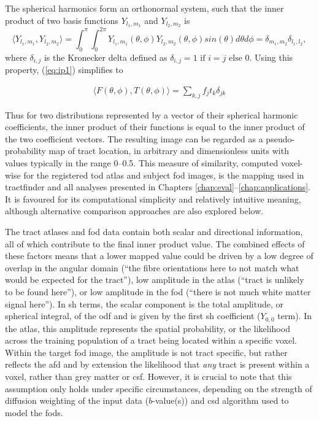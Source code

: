 The spherical harmonics form an orthonormal system, such that the inner product of two basis functions $Y_{l_1,m_1}$ and $Y_{l_2,m_2}$ is
\begin{equation}
  \langle Y_{l_1,m_1}, Y_{l_2,m_2} \rangle
    = \int_0^{\pi} \int_0^{2\pi} Y_{l_1,m_1}(\theta, \phi) Y_{l_2,m_2}(\theta, \phi) sin(\theta) d\theta d\phi
    = \delta_{m_1, m_2} \delta_{l_1, l_2},
\end{equation}
where $\delta_{i,j}$ is the Kronecker delta defined as $\delta_{i,j} = 1 \text{ if } i = j \text{ else } 0$.
Using this property, (\ref{eq:ip1}) simplifies to

\begin{align}
  \langle F(\theta, \phi), T(\theta, \phi) \rangle = \sum_{k,j} f_j t_k \delta_{jk}
\end{align}\label{eq:ip2}

Thus for two distributions represented by a vector of their spherical harmonic coefficients, the inner product of their functions is equal to the inner product of the two coefficient vectors.
The resulting image can be regarded as a pseudo-probability map of tract location, in arbitrary and dimensionless units with values typically in the range 0--0.5.
This measure of similarity, computed voxel-wise for the registered \gls{tod} atlas and subject \gls{fod} images, is the mapping used in tractfinder and all analyses presented in Chapters \ref{chap:eval}--\ref{chap:applications}.
It is favoured for its computational simplicity and relatively intuitive meaning, although alternative comparison approaches are also explored below.

The tract atlases and \gls{fod} data contain both scalar and directional information, all of which contribute to the final inner product value.
The combined effects of these factors means that a lower mapped value could be driven by a low degree of overlap in the angular domain (``the fibre orientations here to not match what would be expected for the tract''), low amplitude in the atlas (``tract is unlikely to be found here''), or low amplitude in the \gls{fod} (``there is not much white matter signal here'').
In \gls{sh} terms, the scalar component is the total amplitude, or spherical integral, of the \gls{odf} and is given by the first \gls{sh} coefficient ($Y_{0,0}$ term).
In the atlas, this amplitude represents the spatial probability, or the likelihood across the training population of a tract being located within a specific voxel.
Within the target \gls{fod} image, the amplitude is not tract specific, but rather reflects the \gls{afd} and by extension the likelihood that \textit{any} tract is present within a voxel, rather than grey matter or \gls{csf}.
However, it is crucial to note that this assumption only holds under specific circumstances, depending on the strength of diffusion weighting of the input data ($b$-value(s)) and \gls{csd} algorithm used to model the \glspl{fod}.


